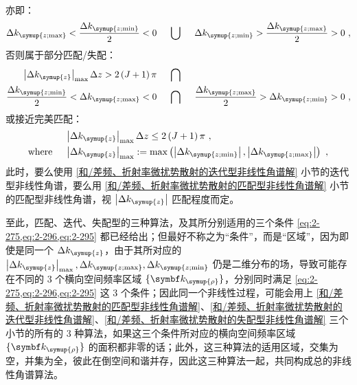 \begin{subequations}
\begin{align}
	\end{align}
\end{subequations}
亦即：
\begin{equation} \label{eq:2-295}
	\Delta k_{\symup{z;\max}} < \frac{ \Delta k_{\symup{z;\min}} }{ 2 } < 0 \ \ \ \ \bigcup\ \ \ \ \Delta k_{\symup{z;\min}} > \frac{ \Delta k_{\symup{z;\max}} }{ 2 } > 0 ~,
\end{equation}
否则属于部分匹配/失配：
\begin{subequations} \label{eq:2-296}
	\abovedisplayskip=13pt
	\belowdisplayskip=13pt
	\begin{align}
		\left| \Delta k_{\symup{z}} \right|_{\max} \Delta z > 2 \left( J+1 \right) \pi\ \ \ \ &\bigcap \label{eq:2-296a} \\ \frac{ \Delta k_{\symup{z;\min}} }{ 2 } < \Delta k_{\symup{z;\max}} < 0 \ \ \ \ &\bigcap\ \ \ \ \frac{ \Delta k_{\symup{z;\max}} }{ 2 } > \Delta k_{\symup{z;\min}} > 0 \label{eq:2-296b}~,
	\end{align}
\end{subequations}
或接近完美匹配：
\begin{subequations} \label{eq:2-297}
	\abovedisplayskip=13pt
	\belowdisplayskip=13pt
	\begin{align}
		&\left| \Delta k_{\symup{z}} \right|_{\max} \Delta z \leq 2 \left( J+1 \right) \pi \label{eq:2-297a}~, \\ \text{where}\ \ \ \ &\left| \Delta k_{\symup{z}} \right|_{\max} := \max \left( \left| \Delta k_{\symup{z;\min}} \right|, \left| \Delta k_{\symup{z;\max}} \right| \right) \label{eq:2-297b}~,
	\end{align}
\end{subequations}
此时，要么使用 \ref{和/差频、折射率微扰势散射的迭代型非线性角谱解} 小节的迭代型非线性角谱，要么用 \ref{和/差频、折射率微扰势散射的匹配型非线性角谱解} 小节的匹配型非线性角谱，视 $\left|\Delta k_{\symup{z}}\right|$ 匹配程度而定。

至此，匹配、迭代、失配型的三种算法，及其所分别适用的三个条件 \cref{eq:2-275,eq:2-296,eq:2-295} 都已经给出；但最好不称之为“条件”，而是“区域”，因为即使是同一个 $\Delta k_{\symup{z}}$，由于其所对应的 $\left| \Delta k_{\symup{z}} \right|_{\max}, \Delta k_{\symup{z;\max}}, \Delta k_{\symup{z;\min}}$ 仍是二维分布的场，导致可能存在不同的 3 个横向空间频率区域 $\{ \symbf k_{\symup{\rho}} \}$，分别同时满足 \cref{eq:2-275,eq:2-296,eq:2-295} 这 3 个条件；因此同一个非线性过程，可能会用上 \ref{和/差频、折射率微扰势散射的匹配型非线性角谱解}、\ref{和/差频、折射率微扰势散射的迭代型非线性角谱解}、\ref{和/差频、折射率微扰势散射的失配型非线性角谱解} 三个小节的所有的 3 种算法，如果这三个条件所对应的横向空间频率区域 $\{ \symbf k_{\symup{\rho}} \}$ 的面积都非零的话；此外，这三种算法的适用区域，交集为空，并集为全，彼此在倒空间和谐并存，因此这三种算法一起，共同构成总的非线性角谱算法。

